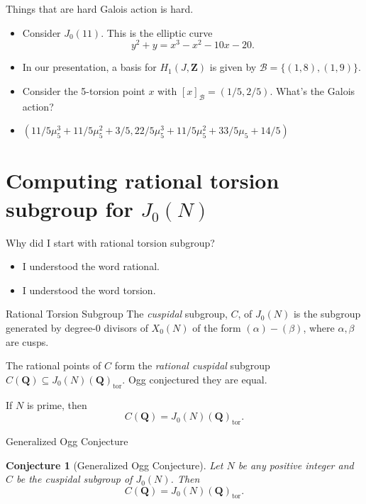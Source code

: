 \documentclass{beamer}
\newtheorem{conjecture}[theorem]{Conjecture}
\newcommand{\QQ}{\mathbf{Q}}
\newcommand{\ZZ}{\mathbf{Z}}
\renewcommand{\ZZ}{\mathbf{Z}}
\newcommand{\tor}{\mathrm{tor}}
\begin{document}
\begin{frame}{Things that are hard}
    Galois action is hard.
    \begin{itemize}
        \item
            Consider $J_0(11)$. This is the elliptic curve
            \[
                y^2 + y = x^3 - x^2 - 10x - 20.
            \]
        \item
            In our presentation, a basis for $H_1(J, \ZZ)$ is given by
            $\mathcal{B}=\{(1,8), (1,9)\}$.
        \item
            Consider the 5-torsion point $x$ with $[x]_\mathcal{B}=(1/5, 2/5)$.
            What's the Galois action?
        \item
            $(11/5 \mu_5^3 + 11/5 \mu_5^2 + 3/5, 22/5 \mu_5 ^3 + 11/5 \mu_5^2 +
            33/5 \mu_5 + 14/5)$
    \end{itemize}
\end{frame}

\section{Computing rational torsion subgroup for $J_0(N)$}

\begin{frame}{Why did I start with rational torsion subgroup?}
    \begin{itemize}
        \item
            I understood the word rational.
        \item
            I understood the word torsion.
    \end{itemize}
\end{frame}


\begin{frame}{Rational Torsion Subgroup}
    The \emph{cuspidal} subgroup, $C$, of $J_0(N)$ is the subgroup generated by
    degree-0 divisors of $X_0(N)$ of the form $(\alpha)-(\beta)$, where
    $\alpha,\beta$ are cusps.

    The rational points of $C$ form the \emph{rational cuspidal} subgroup
    $C(\QQ)\subseteq J_0(N)(\QQ)_\tor$. Ogg conjectured they are equal.

    \begin{theorem}[Mazur '77]
        If $N$ is prime, then
        \[
            C(\QQ)=J_0(N)(\QQ)_\tor.
        \]
    \end{theorem}
\end{frame}

\begin{frame}{Generalized Ogg Conjecture}
    \begin{conjecture}[Generalized Ogg Conjecture]
        Let $N$ be any positive integer and $C$ be the cuspidal subgroup of
        $J_0(N)$. Then
        \[
            C(\QQ) = J_0(N)(\QQ)_\tor.
        \]
    \end{conjecture}
\end{frame}
\end{document}
